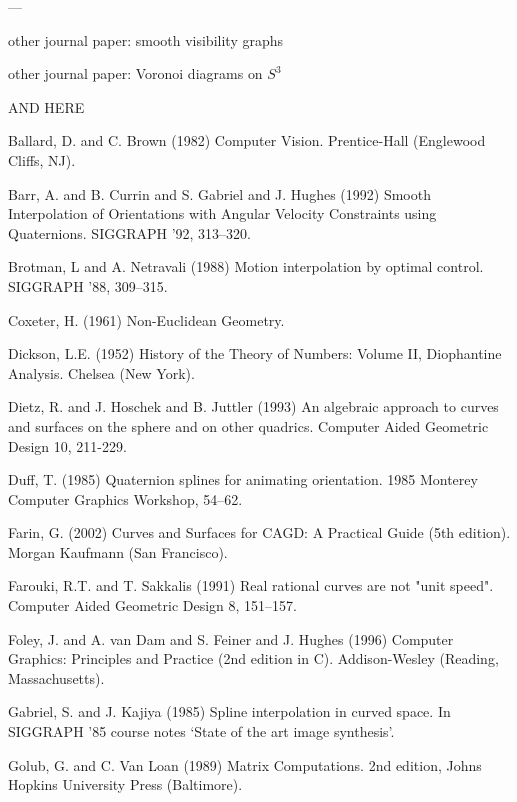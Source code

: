 \documentclass[12pt]{article}
\begin{document}
---

other journal paper: smooth visibility graphs

other journal paper: Voronoi diagrams on $S^3$

\clearpage

AND HERE


\begin{thebibliography}{99}

Ballard, D. and C. Brown (1982)
Computer Vision.
Prentice-Hall (Englewood Cliffs, NJ).

Barr, A. and B. Currin and S. Gabriel and J. Hughes (1992)
Smooth Interpolation of Orientations with Angular Velocity Constraints
using Quaternions.
SIGGRAPH '92, 313--320.

Brotman, L and A. Netravali (1988)
Motion interpolation by optimal control.
SIGGRAPH '88, 309--315.

Coxeter, H. (1961)
Non-Euclidean Geometry.

Dickson, L.E. (1952) History of the Theory of Numbers: Volume II,
Diophantine Analysis.  Chelsea (New York).

Dietz, R. and J. Hoschek and B. Juttler (1993)
An algebraic approach to curves and surfaces on the sphere and
on other quadrics.
Computer Aided Geometric Design 10, 211-229.

Duff, T. (1985)
Quaternion splines for animating orientation.
1985 Monterey Computer Graphics Workshop, 54--62.

Farin, G. (2002)
Curves and Surfaces for CAGD: A Practical Guide (5th edition).
Morgan Kaufmann (San Francisco).

Farouki, R.T. and T. Sakkalis (1991) Real rational curves are not
"unit speed".  Computer Aided Geometric Design 8, 151--157.

Foley, J. and A. van Dam and S. Feiner and J. Hughes (1996)
Computer Graphics: Principles and Practice (2nd edition in C).
Addison-Wesley (Reading, Massachusetts).

Gabriel, S. and J. Kajiya (1985) Spline interpolation in curved space.
In SIGGRAPH '85 course notes `State of the art image synthesis'.

Golub, G. and C. Van Loan (1989)
Matrix Computations.
2nd edition, Johns Hopkins University Press (Baltimore).


\end{thebibliography}
\end{document}
